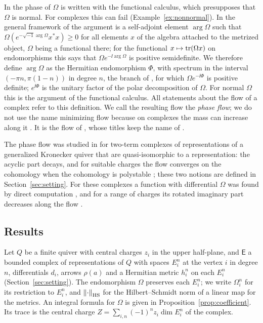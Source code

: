 In \cite[\S5.4]{hkkp26} the phase of $\Omega$ is written with the functional
calculus, which presupposes that $\Omega$ is normal. For complexes this can
fail (Example~\ref{ex:nonnormal}). In the general framework of
\cite[\S4.2]{hkkp26} the argument is a self-adjoint element $\arg\Omega$ such
that $\Omega(e^{-\sqrt{-1}\arg\Omega}x^*x)\geq0$ for all elements $x$ of the
algebra attached to the metrized object, $\Omega$ being a functional there;
for the functional $x\mapsto\operatorname{tr}(\Omega x)$ on endomorphisms this says that
$\Omega e^{-\ii\arg\Omega}$ is positive semidefinite. We therefore define
$\arg\Omega$ as the Hermitian endomorphism $\Phi$, with spectrum in the
interval $(-\pi n,\pi(1-n))$ in degree $n$, the branch of
\cite[(5.15)]{hkkp26}, for which $\Omega e^{-\ii\Phi}$ is positive definite;
$e^{\ii\Phi}$ is the unitary factor of the polar decomposition of $\Omega$.
For normal $\Omega$ this is the argument of the functional calculus. All
statements about the flow of a complex refer to this definition. We call the
resulting flow the \emph{phase flow}; we do not use the name minimizing flow
because on complexes the mass can increase along it
\cite[Theorem~1.1]{wue26a}. It is the flow of \cite{wue26b,wue26c}, whose
titles keep the name of \cite{hkkp26}.

The phase flow was studied in \cite{wue26a,wue26b} for two-term complexes of
representations of a generalized Kronecker quiver that are quasi-isomorphic
to a representation: the acyclic part decays, and for suitable charges the
flow converges on the cohomology when the cohomology is polystable
\cite[Theorems~1.1 and~1.2]{wue26b}; these two notions are defined in
Section~\ref{sec:setting}. For these complexes a function with
differential $\Omega$ was found by direct computation
\cite[Proposition~7.1]{wue26a}, and for a range of charges its rotated
imaginary part decreases along the flow \cite[Theorem~7.6]{wue26b}.

\subsection{Results}
Let $Q$ be a finite quiver with central charges $z_i$ in the upper
half-plane, and $\mathsf E$ a bounded complex of representations of $Q$ with
spaces $E_i^n$ at the vertex $i$ in degree $n$, differentials $d_i$, arrows
$\rho(a)$ and a Hermitian metric $h_i^n$ on each $E_i^n$
(Section~\ref{sec:setting}). The endomorphism $\Omega$ preserves each
$E_i^n$; we write $\Omega_i^n$ for its restriction to $E_i^n$, and
$\left\lVert\cdot\right\rVert_{\mathrm{HS}}$ for the Hilbert--Schmidt norm of a linear map for the
metrics. An integral formula for $\Omega$ is given in
Proposition~\ref{prop:coefficient}. Its trace is the central charge
$Z=\sum_{i,n}(-1)^nz_i\dim E_i^n$ of the complex.

